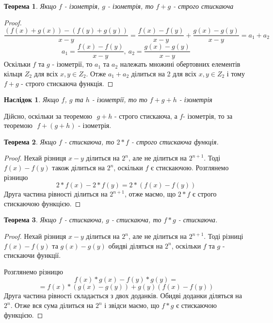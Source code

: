 \documentclass[a4paper,12pt]{article} \usepackage{a4wide}
\numberwithin{equation}{subsection}
\newtheorem{theorem}{Теорема}[subsection]
\newtheorem{corollary}{Наслідок}[subsection]
\begin{document}
\begin{theorem} Якщо $f$ - ізометрія, $g$ - ізометрія, то $f+g$ -
  строго стискаюча
\end{theorem}

\begin{proof}
$$\frac{(f(x)+g(x))-(f(y)+g(y))}{x-y} = \frac{f(x)-f(y)}{x-y} + \frac{g(x)- g(y)}{x-y} = a_1 + a_2$$
$$ a_1 =  \frac{f(x)-f(y)}{x-y},\  a_2 =  \frac{g(x)- g(y)}{x-y}$$
Оскільки $f$ та $g$ - ізометрії, то $a_1$ та $a_2$ належать множині
обертовних елементів кільця $Z_2$ для всіх $x,y \in Z_2$. Отже $a_1 +
a_2$ ділиться на 2 для всіх $x,y \in Z_2$ і тому $f+g$ - строго
стискаюча функція.
\end{proof}






\begin{corollary}

  Якщо $f$, $g$ та $h$ - ізометрії, то то $f+g+h$ - ізометрія
\end{corollary}
Дійсно, оскільки за теоремою $ $ $g+h$ - строго стискаюча, а $f$-
ізометрія, то за теоремою $ $ $f+(g+h)$ - ізометрія.

 \begin{theorem}
   Якщо $f$ - стискаюча, то $2*f$ - строго стискаюча функція.
 \end{theorem}

 \begin{proof} Нехай різниця $x-y$ ділиться на $2^n$, але не ділиться
   на $2^{n+1}$. Тоді $f(x)-f(y)$ також ділиться на $2^n$, оскільки
   $f$ є стискаючою. Розглянемо різницю
  $$ 2*f(x)-2*f(y)= 2*(f(x)-f(y))$$
  Друга частина рівності ділиться на $2^{n+1}$, отже маємо, що $2*f$ є
  строго стискаючою функцією.
\end{proof}

\begin{theorem}Якщо $f$ - стискаюча, $g$ - стискаюча, то $f*g$ -
  стискаюча.
\end{theorem}

\begin{proof} Нехай різниця $x-y$ ділиться на $2^n$, але не ділиться
  на $2^{n+1}$. Тоді різниці $f(x)-f(y)$ та $g(x)-g(y)$ обидві
  діляться на $2^{n}$, оскільки $f$ та $g$ - стискаючи функції.

  Розглянемо різницю
  $$f(x)*g(x)-f(y)*g(y)=$$ $$=f(x)*(g(x)-g(y))+g(y)(f(x)-f(y))$$
  Друга частина рівності складається з двох доданків. Обидві доданки
  діляться на $2^{n}$. Отже вся сума ділиться на $2^{n}$ і звідси
  маємо, що $f*g$ є стискаючою функцією.
\end{proof}
\end{document}
